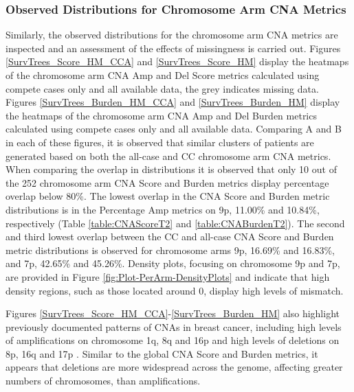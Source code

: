\subsubsection{Observed Distributions for Chromosome Arm CNA Metrics}  
Similarly, the observed distributions for the chromosome arm CNA metrics are inspected and an assessment of the effects of missingness is carried out. Figures \ref{SurvTrees_Score_HM_CCA} and \ref{SurvTrees_Score_HM} display the heatmaps of the chromosome arm CNA Amp and Del Score metrics calculated using compete cases only and all available data, the grey indicates missing data. Figures \ref{SurvTrees_Burden_HM_CCA} and \ref{SurvTrees_Burden_HM} display the heatmaps of the chromosome arm CNA Amp and Del Burden metrics calculated using compete cases only and all available data. Comparing A and B in each of these figures, it is observed that similar clusters of patients are generated based on both the all-case and CC chromosome arm CNA metrics. When comparing the overlap in distributions it is observed that only 10 out of the 252 chromosome arm CNA Score and Burden metrics display percentage overlap below 80\%. The lowest overlap in the CNA Score and Burden metric distributions is in the Percentage Amp metrics on 9p, 11.00\% and 10.84\%, respectively (Table \ref{table:CNAScoreT2} and \ref{table:CNABurdenT2}). The second and third lowest overlap between the CC and all-case CNA Score and Burden metric distributions is observed for chromosome arms 9p, 16.69\% and 16.83\%, and 7p, 42.65\% and 45.26\%. Density plots, focusing on chromosome 9p and 7p, are provided in Figure \ref{fig:Plot-PerArm-DensityPlots} and indicate that high density regions, such as those located around 0, display high levels of mismatch.  

Figures \ref{SurvTrees_Score_HM_CCA}-\ref{SurvTrees_Burden_HM} also highlight previously documented patterns of CNAs in breast cancer, including high levels of amplifications on chromosome 1q, 8q and 16p and high levels of deletions on 8p, 16q and 17p \citep{pmid20576095, pmid22522925}. Similar to the global CNA Score and Burden metrics, it appears that deletions are more widespread across the genome, affecting greater numbers of chromosomes, than amplifications. 

